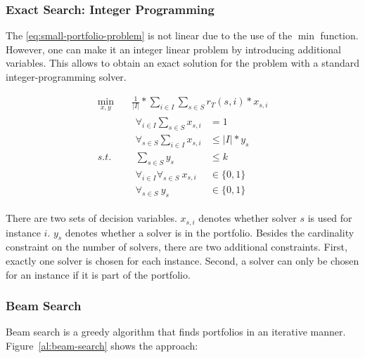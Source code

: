 \documentclass[conference]{IEEEtran}
\begin{document}
\subsubsection{Exact Search: Integer Programming}

The \ref{eq:small-portfolio-problem} is not linear due to the use of the $\min$ function.
However, one can make it an integer linear problem by introducing additional variables.
This allows to obtain an exact solution for the problem with a standard integer-programming solver.

\begin{equation}
	\label{eq:small-portfolio-integer-problem}
	\begin{aligned}
		\min_{x,y} \quad & \frac{1}{|I|} * \sum_{i \in I} \sum_{s \in S} r_T(s,i) * x_{s,i} \\
		s.t. \quad & \begin{aligned}
			\forall_{i\in I} \sum_{s \in S} x_{s,i} &= 1\\
			\forall_{s \in S} \sum_{i \in I} x_{s,i} &\leq |I| * y_s\\
			\sum_{s \in S} y_s &\leq k\\
			\forall_{i\in I} \forall_{s \in S}~x_{s,i} &\in \{0, 1\}\\
			\forall_{s \in S}~y_s &\in \{0,1\}
		\end{aligned}
	\end{aligned}
	\tag{Small-Portfolio Integer Problem}
\end{equation}

There are two sets of decision variables.
$x_{s,i}$ denotes whether solver $s$ is used for instance $i$.
$y_s$ denotes whether a solver is in the portfolio.
Besides the cardinality constraint on the number of solvers, there are two additional constraints.
First, exactly one solver is chosen for each instance.
Second, a solver can only be chosen for an instance if it is part of the portfolio.

\subsubsection{Beam Search}

Beam search is a greedy algorithm that finds portfolios in an iterative manner.
Figure~\ref{al:beam-search} shows the approach:
\end{document}
